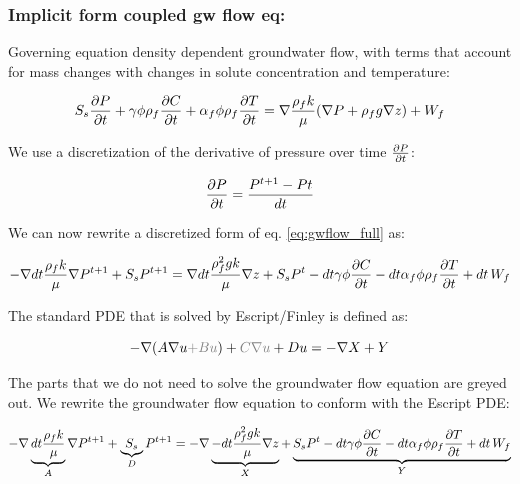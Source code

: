 \documentclass[11pt]{article}
\begin{document}
\subsubsection{Implicit form coupled gw flow eq:}

Governing equation density dependent groundwater flow, with terms that account for mass changes with changes in solute concentration and temperature:

\begin{equation}
	\label{eq:gwflow_full}
	 S_s { \partial P \over {\partial t} } + \gamma \phi \rho_f { \partial C \over{\partial t} } + \alpha_f \phi \rho_f {\partial T \over{\partial t} } = \nabla { \rho_f k \over{\mu} } (\nabla  P + \rho_f g \nabla z) + W_f
\end{equation}

We use a discretization of the derivative of pressure over time ${\partial P \over{\partial t} }$:

\begin{equation}
    {\partial P \over{\partial t}} = { P^{t+1} - P{t} \over{d t} }
\end{equation}

We can now rewrite a discretized form of eq. \ref{eq:gwflow_full} as:

\begin{equation}
	- \nabla dt { \rho_f k \over{\mu} } \nabla  P^{t+1} + S_s P^{t+1} = \nabla dt { \rho_f^2 g k \over{\mu} } \nabla  z + S_s P^{t} - dt \gamma \phi {\partial C \over{\partial t} } - dt \alpha_f \phi \rho_f {\partial T \over{\partial t} }   + dt \, W_f
\end{equation}

The standard PDE that is solved by Escript/Finley is defined as:

\begin{equation}
    - \nabla (A \nabla u {\color{gray}+ B u }) + {\color{gray} C \nabla u }  + D u  = - \nabla X + Y
\end{equation}

The parts that we do not need to solve the groundwater flow equation are greyed out. We rewrite the groundwater flow equation to conform with the Escript PDE:

\begin{equation}
	- \nabla \underbrace{ dt { \rho_f k \over{\mu} } }_A \nabla  P^{t+1} + \underbrace{S_s}_D P^{t+1} = - \nabla \underbrace{ - dt { \rho_f^2 g k \over{\mu} } \nabla  z }_X + \underbrace{ S_s P^{t} - dt \gamma \phi {\partial C \over{\partial t} } - dt \alpha_f \phi \rho_f {\partial T \over{\partial t} }   + dt \, W_f }_Y
\end{equation}
\end{document}
